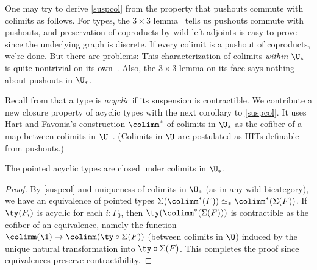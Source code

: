 \documentclass{lmcs}
\theoremstyle{definition}\newtheorem{note}[thm]{Note}
\begin{document}
\begin{rem}
One may try to derive \autoref{suspcol} from the property that pushouts commute with colimits as follows. For types, the $3\times 3$ lemma~\cite[Section VII]{3x3} tells us pushouts commute with pushouts, and preservation of coproducts by wild left adjoints is easy to prove since the underlying graph is discrete. If every colimit is a pushout of coproducts, we're done. But there are problems: This characterization of colimits \emph{within $\U_{\ast}$} is quite nontrivial on its own~\cite[Section 8.1]{CSL25}. Also, the $3\times 3$ lemma on its face says nothing about pushouts in $\U_{\ast}$.
\end{rem}

Recall from \cite{acyclic} that a type is \emph{acyclic} if its suspension is contractible. We contribute a new closure property of acyclic types with the next corollary to \autoref{suspcol}. It uses Hart and Favonia's construction $\colimm^{\ast}$ of colimits in $\U_{\ast}$ as the cofiber of a map between colimits in $\U$~\cite[Theorem 15]{CSL25}. (Colimits in $\U$ are postulated as HITs definable from pushouts.)
\begin{cor} 
The pointed acyclic types are closed under colimits in $\U_{\ast}$.
\end{cor}
\begin{proof}
By \autoref{suspcol} and uniqueness of colimits in $\U_{\ast}$ (as in any wild bicategory), we have an equivalence of pointed types $\Sigma(\colimm^{\ast}(F)) \simeq_{\ast} \colimm^{\ast}(\Sigma(F))$. If $\ty(F_i)$ is acyclic for each $i : \Gamma_0$, then $\ty(\colimm^{\ast}(\Sigma(F)))$ is contractible as the cofiber of an equivalence, namely the function $\colimm(\1) \to \colimm(\ty \circ \Sigma(F))$ (between colimits in $\U$) induced by the unique natural transformation into $\ty \circ \Sigma(F)$. This completes the proof since equivalences preserve contractibility.
\end{proof}
\end{document}
